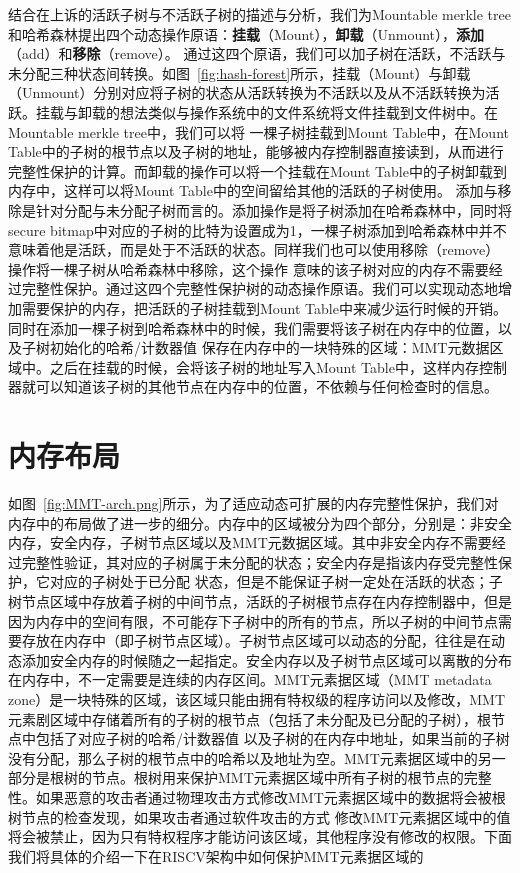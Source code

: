 结合在上诉的活跃子树与不活跃子树的描述与分析，我们为Mountable merkle tree和哈希森林提出四个动态操作原语：\textbf{挂载}（Mount），\textbf{卸载}（Unmount），\textbf{添加}（add）和\textbf{移除}（remove）。
通过这四个原语，我们可以加子树在活跃，不活跃与未分配三种状态间转换。如图~\ref{fig:hash-forest}所示，挂载（Mount）与卸载（Unmount）分别对应将子树的状态从活跃转换为不活跃以及从不活跃转换为活跃。挂载与卸载的想法类似与操作系统中的文件系统将文件挂载到文件树中。在Mountable merkle tree中，我们可以将
一棵子树挂载到Mount Table中，在Mount Table中的子树的根节点以及子树的地址，能够被内存控制器直接读到，从而进行完整性保护的计算。而卸载的操作可以将一个挂载在Mount Table中的子树卸载到内存中，这样可以将Mount Table中的空间留给其他的活跃的子树使用。
添加与移除是针对分配与未分配子树而言的。添加操作是将子树添加在哈希森林中，同时将secure bitmap中对应的子树的比特为设置成为1，一棵子树添加到哈希森林中并不意味着他是活跃，而是处于不活跃的状态。同样我们也可以使用移除（remove）操作将一棵子树从哈希森林中移除，这个操作
意味的该子树对应的内存不需要经过完整性保护。通过这四个完整性保护树的动态操作原语。我们可以实现动态地增加需要保护的内存，把活跃的子树挂载到Mount  Table中来减少运行时候的开销。同时在添加一棵子树到哈希森林中的时候，我们需要将该子树在内存中的位置，以及子树初始化的哈希/计数器值
保存在内存中的一块特殊的区域：MMT元数据区域中。之后在挂载的时候，会将该子树的地址写入Mount Table中，这样内存控制器就可以知道该子树的其他节点在内存中的位置，不依赖与任何检查时的信息。

\section{内存布局}
如图~\ref{fig:MMT-arch.png}所示，为了适应动态可扩展的内存完整性保护，我们对内存中的布局做了进一步的细分。内存中的区域被分为四个部分，分别是：非安全内存，安全内存，子树节点区域以及MMT元数据区域。其中非安全内存不需要经过完整性验证，其对应的子树属于未分配的状态；安全内存是指该内存受完整性保护，它对应的子树处于已分配
状态，但是不能保证子树一定处在活跃的状态；子树节点区域中存放着子树的中间节点，活跃的子树根节点存在内存控制器中，但是因为内存中的空间有限，不可能存下子树中的所有的节点，所以子树的中间节点需要存放在内存中（即子树节点区域）。子树节点区域可以动态的分配，往往是在动态添加安全内存的时候随之一起指定。安全内存以及子树节点区域可以离散的分布在内存中，不一定需要是连续的内存区间。MMT元素据区域（MMT metadata zone）是一块特殊的区域，该区域只能由拥有特权级的程序访问以及修改，MMT元素剧区域中存储着所有的子树的根节点（包括了未分配及已分配的子树），根节点中包括了对应子树的哈希/计数器值
以及子树的在内存中地址，如果当前的子树没有分配，那么子树的根节点中的哈希以及地址为空。MMT元素据区域中的另一部分是根树的节点。根树用来保护MMT元素据区域中所有子树的根节点的完整性。如果恶意的攻击者通过物理攻击方式修改MMT元素据区域中的数据将会被根树节点的检查发现，如果攻击者通过软件攻击的方式
修改MMT元素据区域中的值将会被禁止，因为只有特权程序才能访问该区域，其他程序没有修改的权限。下面我们将具体的介绍一下在RISCV架构中如何保护MMT元素据区域的

